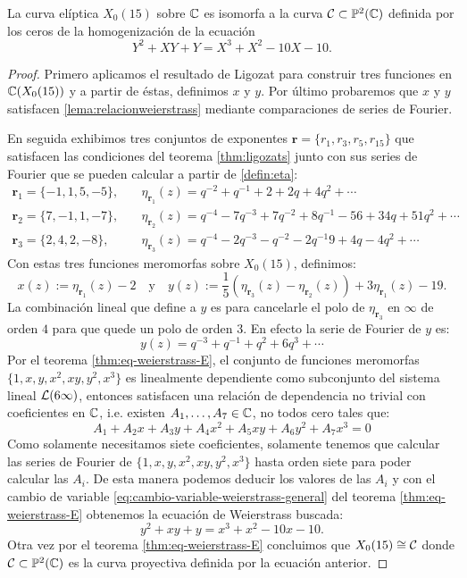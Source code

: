 \begin{lema}\label{lema:eqweierstrassX_0(15)}
	La curva elíptica $X_0(15)$ sobre $\mathbb{C}$ es isomorfa a la curva $\mathcal{C}\subset\mathbb{P}^2(\mathbb{C})$ definida por los ceros de la homogenización de la ecuación
	\begin{equation}\label{lema:relacionweierstrass}
		Y^2+XY+Y=X^3+X^2-10X-10.
	\end{equation}
\end{lema}
\begin{proof}
Primero aplicamos el resultado de Ligozat para construir tres funciones en $\mathbb{C}(X_0(15))$ y a partir de éstas, definimos $x$ y $y$. Por último probaremos que $x$ y $y$ satisfacen \eqref{lema:relacionweierstrass} mediante comparaciones de series de Fourier.

En seguida exhibimos tres conjuntos de exponentes $\mathbf{r}=\{r_1,r_3,r_5,r_{15}\}$ que satisfacen las condiciones del teorema \ref{thm:ligozats} junto con sus series de Fourier que se pueden calcular a partir de \eqref{defin:eta}:
\begin{align*}
	\mathbf{r}_1=\{-1,1,5,-5\},\quad& \eta_{\mathbf{r}_1}(z)=q^{-2}+q^{-1}+2+2q+4q^2+\cdots\\
	\mathbf{r}_2=\{7,-1,1,-7\},\quad& \eta_{\mathbf{r}_2}(z)=q^{-4}-7q^{-3}+7q^{-2}+8q^{-1}-56+34q+51q^2+\cdots\\
	\mathbf{r}_3=\{2,4,2,-8\},\quad&  \eta_{\mathbf{r}_3}(z)=q^{-4}-2q^{-3}-q^{-2}-2q^{-1}9+4q-4q^2+\cdots
\end{align*}
Con estas tres funciones meromorfas sobre $X_0(15)$, definimos:
\[
	x(z):=\eta_{\mathbf{r}_1}(z)-2
	\quad\text{y}\quad
	y(z):=\frac{1}{5}(\eta_{\mathbf{r}_3}(z)-\eta_{\mathbf{r}_2}(z))+3\eta_{\mathbf{r}_1}(z)-19.
\]
La combinación lineal que define a $y$ es para cancelarle el polo de $\eta_{\mathbf{r}_3}$ en $\infty$ de orden $4$ para que quede un polo de orden 3.  En efecto la serie de Fourier de $y$ es:
\[
	y(z)=q^{-3}+q^{-1}+q^2+6q^3+\cdots
\]
 Por el teorema \ref{thm:eq-weierstrass-E}, el conjunto de funciones meromorfas $\{1,x,y,x^2,xy,y^2,x^3\}$ es linealmente dependiente como subconjunto del sistema lineal $\mathcal{L}(6\infty)$, entonces satisfacen una relación de dependencia no trivial con coeficientes en $\mathbb{C}$, i.e. existen $A_1,\ldots,A_7\in\mathbb{C}$, no todos cero tales que:
 \[
 A_1+A_2x+A_3y+A_4x^2+A_5xy+A_6y^2+A_7x^3=0
 \]
Como solamente necesitamos siete coeficientes, solamente tenemos que calcular las series de Fourier de $\{1,x,y,x^2,xy,y^2,x^3\}$ hasta orden siete para poder calcular las $A_i$. De esta manera podemos deducir los valores de las $A_i$ y con el cambio de variable \eqref{eq:cambio-variable-weierstrass-general} del teorema \ref{thm:eq-weierstrass-E} obtenemos la ecuación de Weierstrass buscada:
	\[
		y^2+xy+y=x^3+x^2-10x-10.	
	\]
Otra vez por el teorema \ref{thm:eq-weierstrass-E} concluimos que $X_0(15)\cong\mathcal{C}$ donde $\mathcal{C}\subset\mathbb{P}^2(\mathbb{C})$ es la curva proyectiva definida por la ecuación anterior.
\end{proof}

